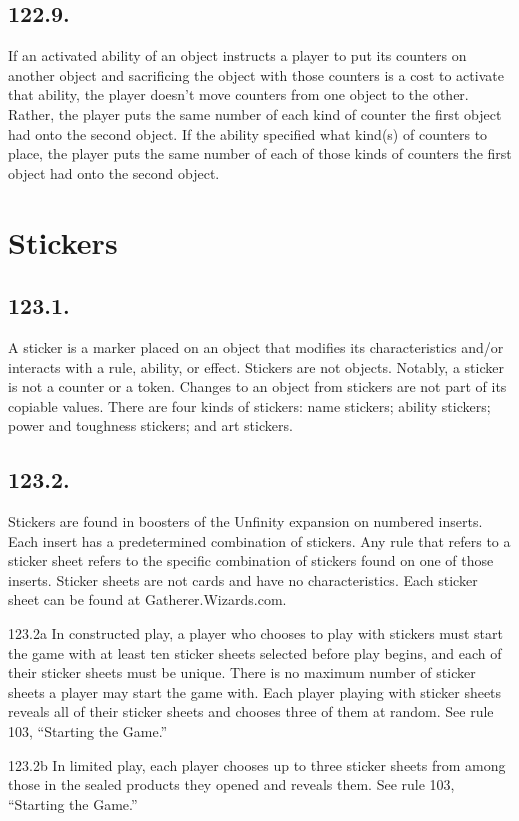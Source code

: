 \subsection*{122.9.}
If an activated ability of an object instructs a player to put its counters on another object and sacrificing the object with those counters is a cost to activate that ability, the player doesn’t move counters from one object to the other. Rather, the player puts the same number of each kind of counter the first object had onto the second object. If the ability specified what kind(s) of counters to place, the player puts the same number of each of those kinds of counters the first object had onto the second object.

\section{Stickers}
\subsection*{123.1.}
A sticker is a marker placed on an object that modifies its characteristics and/or interacts with a rule, ability, or effect. Stickers are not objects. Notably, a sticker is not a counter or a token. Changes to an object from stickers are not part of its copiable values. There are four kinds of stickers: name stickers; ability stickers; power and toughness stickers; and art stickers.

\subsection*{123.2.}
Stickers are found in boosters of the Unfinity expansion on numbered inserts. Each insert has a predetermined combination of stickers. Any rule that refers to a sticker sheet refers to the specific combination of stickers found on one of those inserts. Sticker sheets are not cards and have no characteristics. Each sticker sheet can be found at Gatherer.Wizards.com.

123.2a In constructed play, a player who chooses to play with stickers must start the game with at least ten sticker sheets selected before play begins, and each of their sticker sheets must be unique. There is no maximum number of sticker sheets a player may start the game with. Each player playing with sticker sheets reveals all of their sticker sheets and chooses three of them at random. See rule 103, “Starting the Game.”

123.2b In limited play, each player chooses up to three sticker sheets from among those in the sealed products they opened and reveals them. See rule 103, “Starting the Game.”


